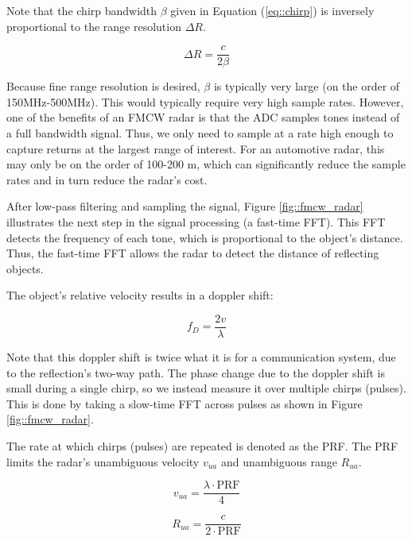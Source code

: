 \documentclass[conference]{IEEEtran}
\begin{document}
	Note that the chirp bandwidth $\beta$ given in Equation (\ref{eq::chirp}) is inversely proportional to the range resolution ${\Delta}R$.
	
	\begin{equation}
		{\Delta}R = \frac{c}{2\beta}
		\label{eq::range_resolution}
	\end{equation}
	
	Because fine range resolution is desired, $\beta$ is typically very large (on the order of 150MHz-500MHz). This would typically require very high sample rates. However, one of the benefits of an FMCW radar is that the ADC samples tones instead of a full bandwidth signal. Thus, we only need to sample at a rate high enough to capture returns at the largest range of interest. For an automotive radar, this may only be on the order of 100-200 m, which can significantly reduce the sample rates and in turn reduce the radar's cost.
	
	After low-pass filtering and sampling the signal, Figure \ref{fig::fmcw_radar} illustrates the next step in the signal processing (a fast-time FFT). This FFT detects the frequency of each tone, which is proportional to the object's distance. Thus, the fast-time FFT allows the radar to detect the distance of reflecting objects.
	
	The object's relative velocity results in a doppler shift:
	
	\begin{equation}
		f_D = \frac{2v}{\lambda}
	\end{equation}
	
	Note that this doppler shift is twice what it is for a communication system, due to the reflection's two-way path. The phase change due to the doppler shift is small during a single chirp, so we instead measure it over multiple chirps (pulses). This is done by taking a slow-time FFT across pulses as shown in Figure \ref{fig::fmcw_radar}.
	
	The rate at which chirps (pulses) are repeated is denoted as the PRF. The PRF limits the radar's unambiguous velocity $v_{ua}$ and unambiguous range $R_{ua}$.
	
	\begin{equation}
		v_{ua} = \frac{\lambda\cdot\text{PRF}}{4}
	\end{equation}
	
	\begin{equation}
		R_{ua} = \frac{c}{2\cdot\text{PRF}}
	\end{equation}
	
\end{document}
